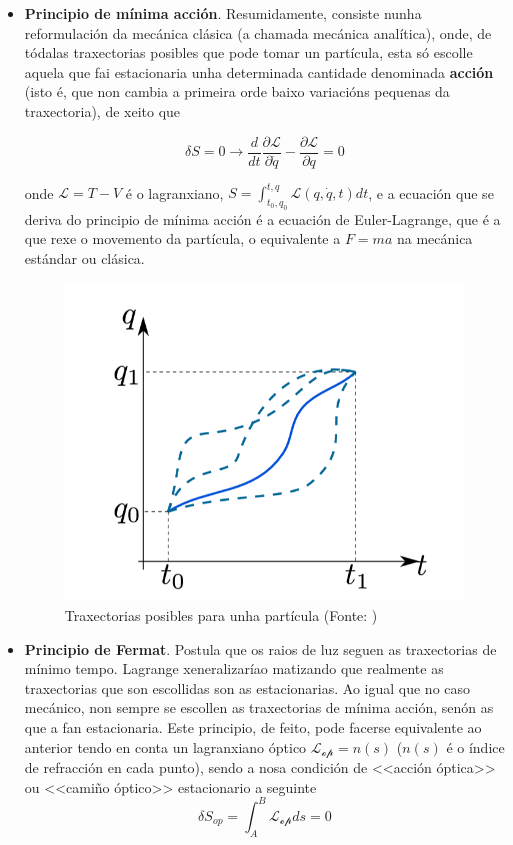 \begin{refsection}
\begin{multicols}{2}
\begin{itemize}
    \item \textbf{Principio de mínima acción}. Resumidamente, consiste nunha
reformulación da mecánica clásica (a chamada mecánica analítica), onde, de
tódalas traxectorias posibles que pode tomar un partícula, esta só escolle
aquela que fai estacionaria unha determinada cantidade denominada
\textbf{acción} (isto é, que non cambia a primeira orde baixo variacións
pequenas da traxectoria), de xeito que

    \begin{equation}
        \delta S = 0 \rightarrow \frac{d}{dt}\frac{\partial
        \mathcal{L}}{\partial \Dot{q}} - \frac{\partial\mathcal{L}}{\partial q} = 0
    \end{equation}

    onde $\mathcal{L} = T-V$ é o lagranxiano,
$S=\int_{t_0,q_0}^{t,q}\mathcal{L}(q,\Dot{q},t)dt$, e a ecuación que se deriva
do principio de mínima acción é a ecuación de Euler-Lagrange, que é a que rexe
o movemento da partícula, o equivalente a $F=ma$ na mecánica estándar ou
clásica.

    \begin{figure}[H]
       \centering
       \includegraphics[width=0.7\linewidth]{revistas/002/imaxes/hj2.png}
       \caption{Traxectorias posibles para unha partícula (Fonte: \cite{bahramhouchmandzadeh_2020})}
    \end{figure}

    \item \textbf{Principio de Fermat}. Postula que os raios de luz seguen as
traxectorias de mínimo tempo. Lagrange xeneralizaríao matizando que realmente
as traxectorias que son escollidas son as estacionarias. Ao igual que no caso
mecánico, non sempre se escollen as traxectorias de mínima acción, senón as que
a fan estacionaria. Este principio, de feito, pode facerse equivalente ao
anterior tendo en conta un lagranxiano óptico $\mathcal{L_{op}} = n(s)$ ($n(s)$
é o índice de refracción en cada punto), sendo a nosa condición de <<acción
óptica>> ou <<camiño óptico>> estacionario a seguinte
    \begin{equation}
        \delta S_{op} = \int_A^B\mathcal{L_{op}}ds = 0
    \end{equation}


\end{itemize}
\end{multicols}
\end{refsection}
